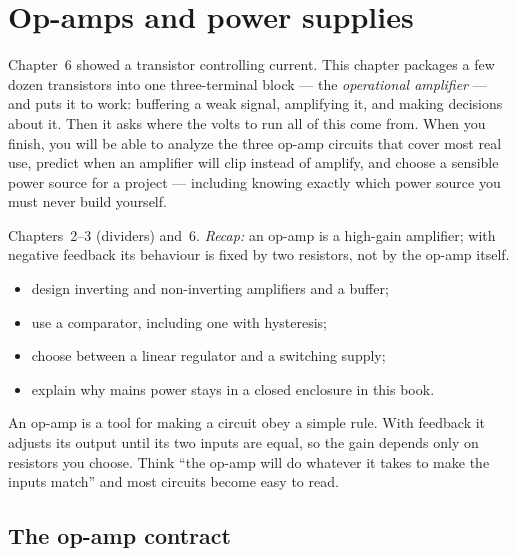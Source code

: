 \chapter{Op-amps and power supplies}
\label{ch:opamps}

Chapter~6 showed a transistor controlling current. This chapter packages
a few dozen transistors into one three-terminal block — the
\emph{operational amplifier} — and puts it to work: buffering a weak
signal, amplifying it, and making decisions about it. Then it asks where
the volts to run all of this come from. When you finish, you will be able
to analyze the three op-amp circuits that cover most real use, predict
when an amplifier will clip instead of amplify, and choose a sensible
power source for a project — including knowing exactly which power source
you must never build yourself.

\begin{rulebox}
Chapters~2--3 (dividers) and~6. \emph{Recap:} an op-amp is a high-gain amplifier; with negative feedback its behaviour is fixed by two resistors, not by the op-amp itself.
\end{rulebox}
\begin{wins}
\begin{itemize}
\item design inverting and non-inverting amplifiers and a buffer;
\item use a comparator, including one with hysteresis;
\item choose between a linear regulator and a switching supply;
\item explain why mains power stays in a closed enclosure in this book.
\end{itemize}
\end{wins}
\begin{principle}
An op-amp is a tool for making a circuit obey a simple rule. With feedback it adjusts its output until its two inputs are equal, so the gain depends only on resistors you choose. Think ``the op-amp will do whatever it takes to make the inputs match'' and most circuits become easy to read.
\end{principle}

\section{The op-amp contract}
\label{sec:opamp}

